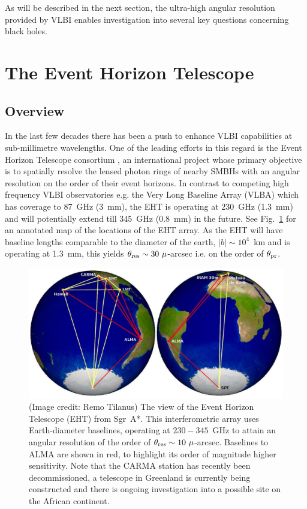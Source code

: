 As will be described in the next section, the ultra-high angular resolution provided by VLBI enables investigation into several key questions concerning black holes.



\section{The Event Horizon Telescope}
\subsection{Overview}

In the last few decades there has been a push to enhance VLBI capabilities at sub-millimetre wavelengths. One of the leading efforts in this regard is the Event Horizon Telescope consortium \citep[(EHT),][]{Doeleman_2010}, an international project whose primary objective is to spatially resolve the lensed photon rings of nearby SMBHs with an angular resolution on the order of their event horizons. In contrast to competing high frequency VLBI observatories e.g. the Very Long Baseline Array (VLBA) which has coverage to 87~GHz (3~mm), the EHT is operating at 230~GHz (1.3~mm) and will potentially extend till 345~GHz (0.8~mm) in the future. See Fig.~\ref{fig:eht_globe} for an annotated map of the locations of the EHT array. As the EHT will have baseline lengths comparable to the diameter of the earth, $|b| \sim 10^4$~km and is operating at 1.3~mm, this yields $\theta_{\rm res} \sim 30\ \mu$-arcsec i.e. on the order of $\theta_{\rm pr}$.

\begin{figure}
\includegraphics[width=0.8\columnwidth]{Images/eht_globe}
\caption{(Image credit: Remo Tilanus) The view of the Event Horizon Telescope (EHT) from Sgr~A*. This interferometric array uses Earth-diameter baselines, operating at $230-345$~GHz to attain an angular resolution of the order of ${\theta_{\rm res} \sim 10\ \mu}$-arcsec. Baselines to ALMA are shown in red, to highlight its order of magnitude higher sensitivity. Note that the CARMA station has recently been decommissioned, a telescope in Greenland is currently being constructed and there is ongoing investigation into a possible site on the African continent.\label{fig:eht_globe}%
}
\end{figure}



